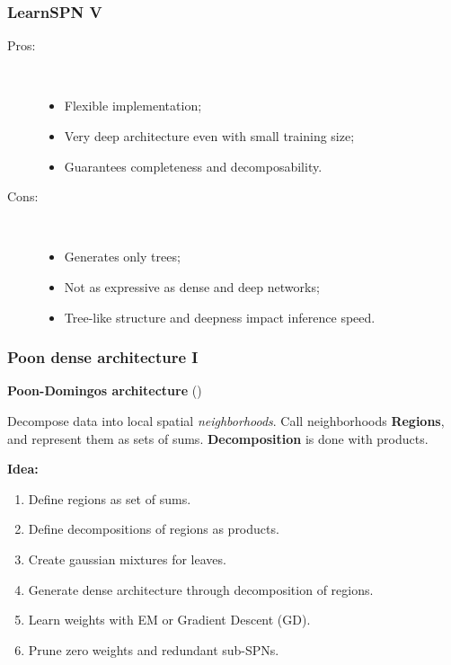 \documentclass[usenames,dvipsnames]{beamer}
\begin{document}
\begin{frame}
  \frametitle{LearnSPN V}

  \begin{description}
    \item[Pros:]~\\
      \begin{itemize}
        \item Flexible implementation;
        \item Very deep architecture even with small training size;
        \item Guarantees completeness and decomposability.
      \end{itemize}
    \item[Cons:]~\\
      \begin{itemize}
        \item Generates only trees;
        \item Not as expressive as dense and deep networks;
        \item Tree-like structure and deepness impact inference speed.
      \end{itemize}
  \end{description}
\end{frame}

\begin{frame}
  \frametitle{Poon dense architecture I}

  {\large\textbf{Poon-Domingos architecture} (\cite{poon-domingos})}

  Decompose data into local spatial \emph{neighborhoods}. Call neighborhoods \textbf{Regions},
  and represent them as sets of sums. \textbf{Decomposition} is done with products.

  \textbf{Idea:}
  \begin{enumerate}
    \item Define regions as set of sums.
    \item Define decompositions of regions as products.
    \item Create gaussian mixtures for leaves.
    \item Generate dense architecture through decomposition of regions.
    \item Learn weights with EM or Gradient Descent (GD).
    \item Prune zero weights and redundant sub-SPNs.
  \end{enumerate}
\end{frame}
\end{document}
